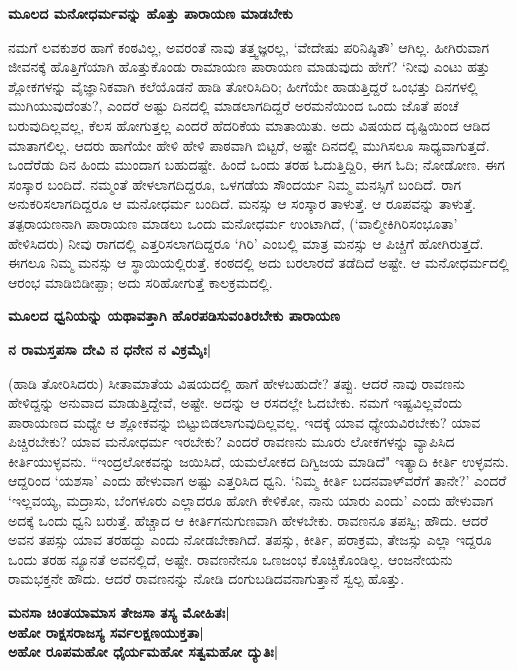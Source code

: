 \large{{\bf ಮೂಲದ ಮನೋಧರ್ಮವನ್ನು ಹೊತ್ತು ಪಾರಾಯಣ ಮಾಡಬೇಕು}} 


ನಮಗೆ ಲವಕುಶರ ಹಾಗೆ ಕಂಠವಿಲ್ಲ, ಅವರಂತೆ ನಾವು ತತ್ತ್ವಜ್ಞರಲ್ಲ, `ವೇದೇಷು ಪರಿನಿಷ್ಠಿತೌ' ಆಗಿಲ್ಲ. ಹೀಗಿರುವಾಗ ಜೀವನಕ್ಕೆ ಹೊತ್ತಿಗೆಯಾಗಿ ಹೊತ್ತುಕೊಂಡು ರಾಮಾಯಣ ಪಾರಾಯಣ ಮಾಡುವುದು ಹೇಗೆ? `ನೀವು ಎಂಟು ಹತ್ತು ಶ್ಲೋಕಗಳನ್ನು ವೈಜ್ಞಾನಿಕವಾಗಿ ಕಲೆಯೊಡನೆ ಹಾಡಿ ತೋರಿಸಿದಿರಿ; ಹೀಗೆಯೇ ಹಾಡುತ್ತಿದ್ದರೆ ಒಂಭತ್ತು ದಿನಗಳಲ್ಲಿ ಮುಗಿಯುವುದೆಂತು?, ಎಂದರೆ ಅಷ್ಟು ದಿನದಲ್ಲಿ ಮಾಡಲಾಗದಿದ್ದರೆ ಅರಮನೆಯಿಂದ ಒಂದು ಜೊತೆ ಪಂಚೆ ಬರುವುದಿಲ್ಲವಲ್ಲ, ಕೆಲಸ ಹೋಗುತ್ತಲ್ಲ ಎಂದರೆ ಹೆದರಿಕೆಯ ಮಾತಾಯಿತು. ಅದು ವಿಷಯದ ದೃಷ್ಟಿಯಿಂದ ಆಡಿದ ಮಾತಾಗಲಿಲ್ಲ. ಆದರು ಹಾಗೆಯೇ ಹೇಳಿ ಹೇಳಿ ಪಾಠವಾಗಿ ಬಿಟ್ಟರೆ, ಅಷ್ಟೇ ದಿನದಲ್ಲಿ ಮುಗಿಸಲೂ ಸಾಧ್ಯವಾಗುತ್ತದೆ. ಒಂದೆರೆಡು ದಿನ ಹಿಂದು ಮುಂದಾಗ ಬಹುದಷ್ಟೇ. ಹಿಂದೆ ಒಂದು ತರಹ ಓದುತ್ತಿದ್ದಿರಿ, ಈಗ ಓದಿ; ನೋಡೋಣ. ಈಗ ಸಂಸ್ಕಾರ ಬಂದಿದೆ. ನಮ್ಮಂತೆ ಹೇಳಲಾಗದಿದ್ದರೂ, ಒಳಗಡೆಯ ಸೌಂದರ್ಯ ನಿಮ್ಮ ಮನಸ್ಸಿಗೆ ಬಂದಿದೆ. ರಾಗ ಅನುಕರಿಸಲಾಗದಿದ್ದರೂ ಆ ಮನೋಧರ್ಮ ಬಂದಿದೆ. ಮನಸ್ಸು ಆ ಸಂಸ್ಕಾರ ತಾಳುತ್ತೆ. ಆ ರೂಪವನ್ನು ತಾಳುತ್ತೆ. ತತ್ಪರಾಯಣನಾಗಿ ಪಾರಾಯಣ ಮಾಡಲು ಒಂದು ಮನೋಧರ್ಮ ಉಂಟಾಗಿದೆ, (`ವಾಲ್ಮೀಕಿಗಿರಿಸಂಭೂತಾ' ಹೇಳಿಸಿದರು) ನೀವು ರಾಗದಲ್ಲಿ ಎತ್ತರಿಸಲಾಗದಿದ್ದರೂ `ಗಿರಿ' ಎಂಬಲ್ಲಿ ಮಾತ್ರ ಮನಸ್ಸು ಆ ಪಿಚ್ಚಿಗೆ ಹೋಗಿರುತ್ತದೆ. ಈಗಲೂ ನಿಮ್ಮ ಮನಸ್ಸು ಆ ಸ್ಥಾಯಿಯಲ್ಲಿರುತ್ತೆ. ಕಂಠದಲ್ಲಿ ಅದು ಬರಲಾರದೆ ತಡೆದಿದೆ ಅಷ್ಟೇ. ಆ ಮನೋಧರ್ಮದಲ್ಲಿ ಆರಂಭ ಮಾಡಿಬಿಡೀಪ್ಪಾ; ಅದು ಸರಿಹೋಗುತ್ತೆ ಕಾಲಕ್ರಮದಲ್ಲಿ. 


\large{{\bf ಮೂಲದ ಧ್ವನಿಯನ್ನು ಯಥಾವತ್ತಾಗಿ ಹೊರಪಡಿಸುವಂತಿರಬೇಕು ಪಾರಾಯಣ}} 


\begin{center} 

{\bf ನ ರಾಮಸ್ತಪಸಾ ದೇವಿ ನ ಧನೇನ ನ ವಿಕ್ರಮೈಃ|} 

\end{center} 


(ಹಾಡಿ ತೋರಿಸಿದರು) ಸೀತಾಮಾತೆಯ ವಿಷಯದಲ್ಲಿ ಹಾಗೆ ಹೇಳಬಹುದೇ? ತಪ್ಪು. ಆದರೆ ನಾವು ರಾವಣನು ಹೇಳಿದ್ದನ್ನು ಅನುವಾದ ಮಾಡುತ್ತಿದ್ದೇವೆ, ಅಷ್ಟೇ. ಅದನ್ನು ಆ ರಸದಲ್ಲೇ ಓದಬೇಕು. ನಮಗೆ ಇಷ್ಟವಿಲ್ಲವೆಂದು ಪಾರಾಯಣದ ಮಧ್ಯೇ ಆ ಶ್ಲೋಕವನ್ನು ಬಿಟ್ಟುಬಿಡಲಾಗುವುದಿಲ್ಲವಲ್ಲ. ಇದಕ್ಕೆ ಯಾವ ಧ್ಯೇಯವಿರಬೇಕು? ಯಾವ ಪಿಚ್ಚಿರಬೇಕು? ಯಾವ ಮನೋಧರ್ಮ ಇರಬೇಕು? ಎಂದರೆ ರಾವಣನು ಮೂರು ಲೋಕಗಳನ್ನು ವ್ಯಾಪಿಸಿದ ಕೀರ್ತಿಯುಳ್ಳವನು. ``ಇಂದ್ರಲೋಕವನ್ನು ಜಯಿಸಿದೆ, ಯಮಲೋಕದ ದಿಗ್ವಿಜಯ ಮಾಡಿದೆ" ಇತ್ಯಾದಿ ಕೀರ್ತಿ ಉಳ್ಳವನು. ಆದ್ದರಿಂದ `ಯಶಸಾ' ಎಂದು ಹೇಳುವಾಗ ಅಷ್ಟು ಎತ್ತರಿಸಿದ ಧ್ವನಿ. `ನಿಮ್ಮ ಕೀರ್ತಿ ಬದನವಾಳ್‍ವರೆಗೆ ತಾನೇ?' ಎಂದರೆ `ಇಲ್ಲವಯ್ಯ, ಮದ್ರಾಸು, ಬೆಂಗಳೂರು ಎಲ್ಲಾದರೂ ಹೋಗಿ ಕೇಳಿಕೋ, ನಾನು ಯಾರು ಎಂದು' ಎಂದು ಹೇಳುವಾಗ ಅದಕ್ಕೆ ಒಂದು ಧ್ವನಿ ಬರುತ್ತೆ. ಹೆಚ್ಚಾದ ಆ ಕೀರ್ತಿಗನುಗುಣವಾಗಿ ಹೇಳಬೇಕು. ರಾವಣನೂ ತಪಸ್ವಿ; ಹೌದು. ಆದರೆ ಅವನ ತಪಸ್ಸು ಯಾವ ತರಹದ್ದು ಎಂದು ನೋಡಬೇಕಾಗಿದೆ. ತಪಸ್ಸು, ಕೀರ್ತಿ, ಪರಾಕ್ರಮ, ತೇಜಸ್ಸು ಎಲ್ಲಾ ಇದ್ದರೂ ಒಂದು ತರಹ ನ್ಯೂನತೆ ಅವನಲ್ಲಿದೆ, ಅಷ್ಟೇ. ರಾವಣನೇನೂ ಒಣಜಂಭ ಕೊಚ್ಚಿಕೊಂಡಿಲ್ಲ. ಆಂಜನೇಯನು ರಾಮಭಕ್ತನೇ ಹೌದು. ಆದರೆ ರಾವಣನನ್ನು ನೋಡಿ ದಂಗುಬಡಿದವನಾಗುತ್ತಾನೆ ಸ್ವಲ್ಪ ಹೊತ್ತು. 


\begin{center} 

{\bf ಮನಸಾ ಚಿಂತಯಾಮಾಸ ತೇಜಸಾ ತಸ್ಯ ಮೋಹಿತಃ|\\ 

ಅಹೋ ರಾಕ್ಷಸರಾಜಸ್ಯ ಸರ್ವಲಕ್ಷಣಯುಕ್ತತಾ|\\ 

ಅಹೋ ರೂಪಮಹೋ ಧೈರ್ಯಮಹೋ ಸತ್ವಮಹೋ ದ್ಯುತಿಃ|} 

\end{center} 


